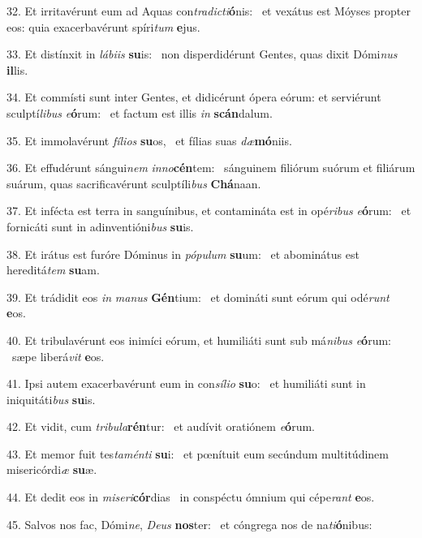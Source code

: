 32. Et irritavérunt eum ad Aquas con\textit{tra}\textit{dic}\textit{ti}\textbf{ó}nis: \ast\  et vexátus est Móyses propter eos: quia exacerbavérunt spíri\textit{tum} \textbf{e}jus.\

33. Et distínxit in \textit{lá}\textit{bi}\textit{is} \textbf{su}is: \ast\  non disperdidérunt Gentes, quas dixit Dómi\textit{nus} \textbf{il}lis.\

34. Et commísti sunt inter Gentes, et didicérunt ópera eórum: et serviérunt sculptí\textit{li}\textit{bus} \textit{e}\textbf{ó}rum: \ast\  et factum est illis \textit{in} \textbf{scán}dalum.\

35. Et immolavérunt \textit{fí}\textit{li}\textit{os} \textbf{su}os, \ast\  et fílias suas \textit{dæ}\textbf{mó}niis.\

36. Et effudérunt sángui\textit{nem} \textit{in}\textit{no}\textbf{cén}tem: \ast\  sánguinem filiórum suórum et filiárum suárum, quas sacrificavérunt sculptíli\textit{bus} \textbf{Chá}naan.\

37. Et infécta est terra in sanguínibus, et contamináta est in opé\textit{ri}\textit{bus} \textit{e}\textbf{ó}rum: \ast\  et fornicáti sunt in adinventióni\textit{bus} \textbf{su}is.\

38. Et irátus est furóre Dóminus in \textit{pó}\textit{pu}\textit{lum} \textbf{su}um: \ast\  et abominátus est hereditá\textit{tem} \textbf{su}am.\

39. Et trádidit eos \textit{in} \textit{ma}\textit{nus} \textbf{Gén}tium: \ast\  et domináti sunt eórum qui odé\textit{runt} \textbf{e}os.\

40. Et tribulavérunt eos inimíci eórum, et humiliáti sunt sub má\textit{ni}\textit{bus} \textit{e}\textbf{ó}rum: \ast\  sæpe liberá\textit{vit} \textbf{e}os.\

41. Ipsi autem exacerbavérunt eum in con\textit{sí}\textit{li}\textit{o} \textbf{su}o: \ast\  et humiliáti sunt in iniquitáti\textit{bus} \textbf{su}is.\

42. Et vidit, cum \textit{tri}\textit{bu}\textit{la}\textbf{rén}tur: \ast\  et audívit oratiónem \textit{e}\textbf{ó}rum.\

43. Et memor fuit tes\textit{ta}\textit{mén}\textit{ti} \textbf{su}i: \ast\  et pœnítuit eum secúndum multitúdinem misericórdi\textit{æ} \textbf{su}æ.\

44. Et dedit eos in \textit{mi}\textit{se}\textit{ri}\textbf{cór}dias \ast\  in conspéctu ómnium qui cépe\textit{rant} \textbf{e}os.\

45. Salvos nos fac, Dómi\textit{ne}, \textit{De}\textit{us} \textbf{nos}ter: \ast\  et cóngrega nos de na\textit{ti}\textbf{ó}nibus:\

